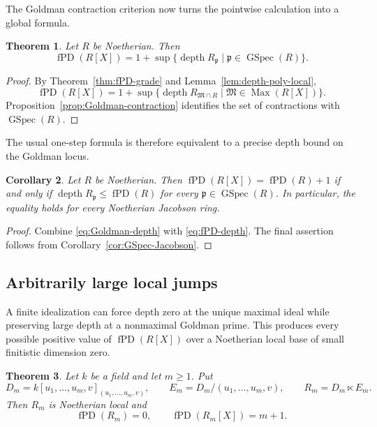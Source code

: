 \documentclass[11pt]{amsart}
\numberwithin{equation}{section}
\newtheorem{theorem}{Theorem}[section]
\newtheorem{corollary}[theorem]{Corollary}
\theoremstyle{definition}
\theoremstyle{remark}
\newcommand{\fPD}{\operatorname{fPD}}
\newcommand{\Max}{\operatorname{Max}}
\newcommand{\GSpec}{\operatorname{GSpec}}
\newcommand{\depth}{\operatorname{depth}}
\begin{document}
The Goldman contraction criterion now turns the pointwise calculation into a global formula.

\begin{theorem}\label{thm:Goldman-depth}
Let $R$ be Noetherian.  Then
\begin{equation}\label{eq:Goldman-depth}
 \fPD(R[X])
 =1+\sup\{\depth R_{\mathfrak p}\mid \mathfrak p\in\GSpec(R)\}.
\end{equation}
\end{theorem}

\begin{proof}
By Theorem~\ref{thm:fPD-grade} and Lemma~\ref{lem:depth-poly-local},
\[
 \fPD(R[X])
 =1+\sup\{\depth R_{\mathfrak M\cap R}\mid \mathfrak M\in\Max(R[X])\}.
\]
Proposition~\ref{prop:Goldman-contraction} identifies the set of contractions with $\GSpec(R)$.
\end{proof}

The usual one-step formula is therefore equivalent to a precise depth bound on the Goldman locus.

\begin{corollary}\label{cor:one-step-criterion}
Let $R$ be Noetherian.  Then $\fPD(R[X])=\fPD(R)+1$ if and only if $\depth R_{\mathfrak p}\leq\fPD(R)$ for every $\mathfrak p\in\GSpec(R)$.  In particular, the equality holds for every Noetherian Jacobson ring.
\end{corollary}

\begin{proof}
Combine \eqref{eq:Goldman-depth} with \eqref{eq:fPD-depth}.  The final assertion follows from Corollary~\ref{cor:GSpec-Jacobson}.
\end{proof}




\subsection{Arbitrarily large local jumps}

A finite idealization can force depth zero at the unique maximal ideal while preserving large depth at a nonmaximal Goldman prime.  This produces every possible positive value of $\fPD(R[X])$ over a Noetherian local base of small finitistic dimension zero.

\begin{theorem}\label{thm:Noetherian-jumps}
Let $k$ be a field and let $m\geq1$.  Put
\[
 D_m=k[u_1,\ldots,u_m,v]_{(u_1,\ldots,u_m,v)},
 \qquad
 E_m=D_m/(u_1,\ldots,u_m,v),
 \qquad
 R_m=D_m\ltimes E_m.
\]
Then $R_m$ is Noetherian local and
\[
 \fPD(R_m)=0,
 \qquad
 \fPD(R_m[X])=m+1.
\]
\end{theorem}
\end{document}
